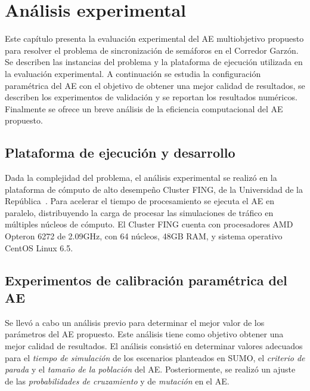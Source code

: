\chapter{Análisis experimental}
Este capítulo presenta la evaluación experimental del AE multiobjetivo propuesto para resolver el problema de sincronización de semáforos en el Corredor Garzón. Se describen las instancias del problema y la plataforma de ejecución utilizada en la evaluación experimental. A continuación se estudia la configuración paramétrica del AE con el objetivo de obtener una mejor calidad de resultados, se describen los experimentos de validación y se reportan los resultados numéricos. Finalmente se ofrece un breve análisis de la eficiencia computacional del AE propuesto.

\section{Plataforma de ejecución y desarrollo}

Dada la complejidad del problema, el análisis experimental se realizó en la plataforma de cómputo de alto desempeño Cluster FING, de la Universidad de la República~\citep{nesmachnow2010computacion}. Para acelerar el tiempo de procesamiento se ejecuta el AE en paralelo, distribuyendo la carga de procesar las simulaciones de tráfico en múltiples núcleos de cómputo. El Cluster FING cuenta con procesadores AMD Opteron 6272 de 2.09GHz, con 64 núcleos, 48GB RAM, y sistema operativo CentOS Linux 6.5.



\section{Experimentos de calibración paramétrica del AE}
Se llevó a cabo un análisis previo para determinar el mejor valor de los parámetros del AE propuesto. Este análisis tiene como objetivo obtener una mejor calidad de resultados. El análisis consistió en determinar valores adecuados para el \emph{tiempo de simulación} de los escenarios planteados en SUMO, el \emph{criterio de parada} y el \emph{tamaño de la población} del AE. Posteriormente, se realizó un ajuste de las \emph{probabilidades de cruzamiento} y de \emph{mutación} en el AE. 


